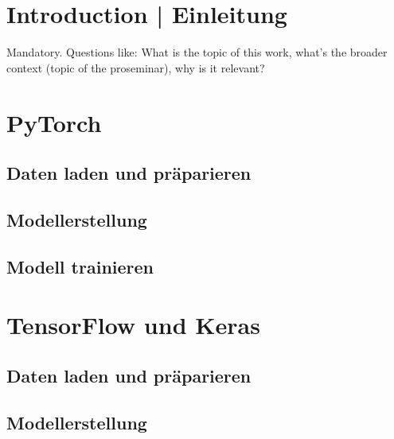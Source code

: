 \section{Introduction | Einleitung}
Mandatory. Questions like: What is the topic of this work, what's the broader context (topic of the proseminar), why is it relevant?

\section{PyTorch}
\subsection{Daten laden und präparieren}



\subsection{Modellerstellung}



\subsection{Modell trainieren}



\section{TensorFlow und Keras}
\subsection{Daten laden und präparieren}



\subsection{Modellerstellung}

